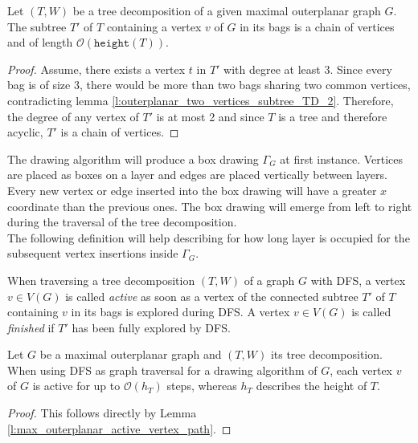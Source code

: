 \begin{lemma}
	Let $(T,W)$ be a tree decomposition of a given maximal outerplanar graph $G$. The subtree $T'$ of $T$ containing a vertex $v$ of $G$ in its bags is a chain of vertices and of length $\mathcal{O}(\texttt{height}(T))$.\label{l:max_outerplanar_active_vertex_path}
\end{lemma}
\begin{proof}
	Assume, there exists a vertex $t$ in $T'$ with degree at least 3. Since every bag is of size 3, there would be more than two bags sharing two common vertices, contradicting lemma \ref{l:outerplanar_two_vertices_subtree_TD_2}. Therefore, the degree of any vertex of $T'$ is at most 2 and since $T$ is a tree and therefore acyclic, $T'$ is a chain of vertices.
\end{proof}
The drawing algorithm will produce a box drawing $\Gamma_{G}$ at first instance. Vertices are placed as boxes on a layer and edges are placed vertically between layers. Every new vertex or edge inserted into the box drawing will have a greater $x$ coordinate than the previous ones. The box drawing will emerge from left to right during the traversal of the tree decomposition.\\
The following definition will help describing for how long layer is occupied for the subsequent vertex insertions inside $\Gamma_{G}$.
\begin{definition}
	When traversing a tree decomposition $(T,W)$ of a graph $G$ with DFS, a vertex $v\in V(G)$ is called \emph{active} as soon as a vertex of the connected subtree $T'$ of $T$ containing $v$ in its bags is explored during DFS. A vertex $v\in V(G)$ is called \emph{finished} if $T'$ has been fully explored by DFS.
\end{definition}

\begin{lemma}
	Let $G$ be a maximal outerplanar graph and $(T,W)$ its tree decomposition. When using DFS as graph traversal for a drawing algorithm of $G$, each vertex $v$ of $G$ is active for up to $\mathcal{O}(h_{T})$ steps, whereas $h_T$ describes the height of $T$.\label{l:one_vertex_active_height}
\end{lemma}
\begin{proof}
	This follows directly by Lemma \ref{l:max_outerplanar_active_vertex_path}.
\end{proof}

